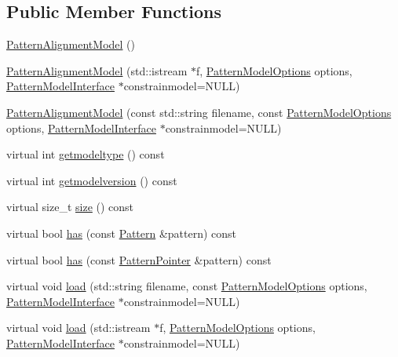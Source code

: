 \subsection*{Public Member Functions}
\begin{DoxyCompactItemize}
\item 
\hyperlink{classPatternAlignmentModel_ae3bc572f6931c070eda7532f7f38cffb}{Pattern\+Alignment\+Model} ()
\item 
\hyperlink{classPatternAlignmentModel_a993125d3b974dc0b6a0687edf2351bfd}{Pattern\+Alignment\+Model} (std\+::istream $\ast$f, \hyperlink{classPatternModelOptions}{Pattern\+Model\+Options} options, \hyperlink{classPatternModelInterface}{Pattern\+Model\+Interface} $\ast$constrainmodel=N\+U\+L\+L)
\item 
\hyperlink{classPatternAlignmentModel_a345ff8a3e9d592c6b7621ee33dc44666}{Pattern\+Alignment\+Model} (const std\+::string filename, const \hyperlink{classPatternModelOptions}{Pattern\+Model\+Options} options, \hyperlink{classPatternModelInterface}{Pattern\+Model\+Interface} $\ast$constrainmodel=N\+U\+L\+L)
\item 
virtual int \hyperlink{classPatternAlignmentModel_a09c9e5d1d2287e1d751e0f70add38923}{getmodeltype} () const 
\item 
virtual int \hyperlink{classPatternAlignmentModel_adc7008d0dc96afc19d6b61ccde38c3c8}{getmodelversion} () const 
\item 
virtual size\+\_\+t \hyperlink{classPatternAlignmentModel_a7e4b2a69fd2e0852af0ed6ffaf6c51dc}{size} () const 
\item 
virtual bool \hyperlink{classPatternAlignmentModel_a4822a730be0dabeebd06771c803b8254}{has} (const \hyperlink{classPattern}{Pattern} \&pattern) const 
\item 
virtual bool \hyperlink{classPatternAlignmentModel_ad81e599091c476a9cb121e7e04a4da5a}{has} (const \hyperlink{classPatternPointer}{Pattern\+Pointer} \&pattern) const 
\item 
virtual void \hyperlink{classPatternAlignmentModel_af9d29f9bd63804ece43632b866042077}{load} (std\+::string filename, const \hyperlink{classPatternModelOptions}{Pattern\+Model\+Options} options, \hyperlink{classPatternModelInterface}{Pattern\+Model\+Interface} $\ast$constrainmodel=N\+U\+L\+L)
\item 
virtual void \hyperlink{classPatternAlignmentModel_a1ea66828aca73e774ad10985bc37fe8b}{load} (std\+::istream $\ast$f, \hyperlink{classPatternModelOptions}{Pattern\+Model\+Options} options, \hyperlink{classPatternModelInterface}{Pattern\+Model\+Interface} $\ast$constrainmodel=N\+U\+L\+L)

\end{DoxyCompactItemize}
